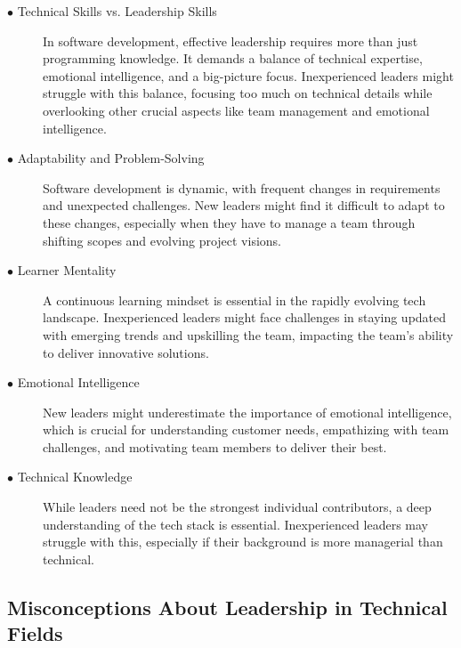 \documentclass[runningheads]{llncs}
\begin{document}
\begin{description}
  \item [$\bullet$ Technical Skills vs. Leadership Skills] In software development, effective leadership requires more than just programming knowledge. It demands a balance of technical expertise, emotional intelligence, and a big-picture focus. Inexperienced leaders might struggle with this balance, focusing too much on technical details while overlooking other crucial aspects like team management and emotional intelligence.
  \\
  
  \item [$\bullet$ Adaptability and Problem-Solving] Software development is dynamic, with frequent changes in requirements and unexpected challenges. New leaders might find it difficult to adapt to these changes, especially when they have to manage a team through shifting scopes and evolving project visions.
  \\

  \item [$\bullet$ Learner Mentality] A continuous learning mindset is essential in the rapidly evolving tech landscape. Inexperienced leaders might face challenges in staying updated with emerging trends and upskilling the team, impacting the team's ability to deliver innovative solutions.
  \\
  
  \item [$\bullet$ Emotional Intelligence] New leaders might underestimate the importance of emotional intelligence, which is crucial for understanding customer needs, empathizing with team challenges, and motivating team members to deliver their best.
  \\
  
  \item [$\bullet$ Technical Knowledge] While leaders need not be the strongest individual contributors, a deep understanding of the tech stack is essential. Inexperienced leaders may struggle with this, especially if their background is more managerial than technical.
  \\
  
\end{description}

\subsection{Misconceptions About Leadership in Technical Fields}
\end{document}
